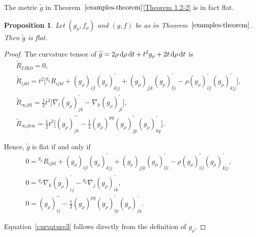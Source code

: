 \documentclass[pdftex]{sigma}
\numberwithin{equation}{section}
\newtheorem{Proposition}[Theorem]{Proposition}
 { \theoremstyle{definition}
\newtheorem{Definition}[Theorem]{Definition}
\newtheorem{Note}[Theorem]{Note}
\newtheorem{Example}[Theorem]{Example}
\newtheorem{Remark}[Theorem]{Remark} }
\begin{document}
The metric $\widetilde{g}$ in Theorem~$\ref{examples-theorem}$\ref{Theorem 1.2-2} is in fact flat.
\begin{Proposition}
\label{conformally-flat-theorem}
Let $(g_\rho,f_\rho)$ and $(g,f)$ be as in Theorem~$\ref{examples-theorem}$. Then $\widetilde{g}$ is flat.
\end{Proposition}

\begin{proof}
The curvature tensor of $\widetilde{g}=2\rho\,\mathrm{d}\rho\, \mathrm{d}t+t^2 g_\rho+2t\,{\rm d}\rho\, \mathrm{d}t$ is \cite[equation (6.1)]{FeffermanGraham2012}
\begin{gather*}
\widetilde{R}_{IJK0} = 0,
\\
\widetilde{R}_{i j k l} =t^{2}\bigl[{}^{g_\rho}R_{i j k l}+(g_\rho)_{i[l} (g_\rho)_{k] j}^{\prime}+(g_\rho)_{j[k} (g_\rho)_{l] i}^{\prime}-\rho (g_\rho)_{i[l}^{\prime} (g_\rho)_{k] j}^{\prime}\bigr],
\\
\widetilde{R}_{\infty j k l} =\frac{1}{2} t^{2}\bigl[\nabla_{l} (g_\rho)_{j k}^{\prime}-\nabla_{k} (g_\rho)_{j l}^{\prime}\bigr],
\\
\widetilde{R}_{\infty j k \infty} =\frac{1}{2} t^{2}\biggl[(g_\rho)_{j k}^{\prime \prime}-\frac{1}{2} (g_\rho)^{p q} (g_\rho)_{j p}^{\prime} (g_\rho)_{k q}^{\prime}\biggr].
\end{gather*}

Hence, $\widetilde{g}$ is flat if and only if
\begin{subequations}
\begin{gather}
0={ }^{g_\rho} R_{i j k l}+(g_\rho)_{i[l} (g_\rho)_{k] j}^{\prime}+(g_\rho)_{j[k} (g_\rho)_{l] i}^{\prime}-\rho (g_\rho)_{i[l}^{\prime} (g_\rho)_{k] j}^{\prime},
\label{curvature1}
\\
\label{curvature2}
0={ }^{g_\rho} \nabla_{k} (g_\rho)_{i j}^{\prime}-{ }^{g_\rho} \nabla_{j} (g_\rho)_{i k}^{\prime},
\\
\label{curvature3}
0=(g_\rho)_{i j}^{\prime \prime}-\frac{1}{2} (g_\rho)^{p q} (g_\rho)_{i p}^{\prime} (g_\rho)_{j q}^{\prime}.
\end{gather}
\end{subequations}

Equation~\eqref{curvature3} follows directly from the definition of $g_\rho$.



\end{proof}
\end{document}
